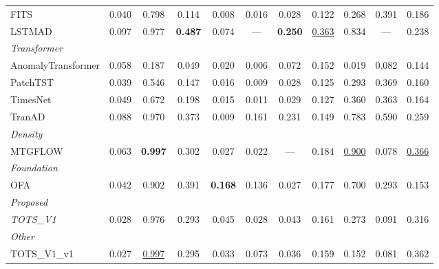 \begin{table}[t]
\begin{tabular}{lcccccccccc}
FITS & 0.040 & 0.798 & 0.114 & 0.008 & 0.016 & 0.028 & 0.122 & 0.268 & 0.391 & 0.186 \\
LSTMAD & 0.097 & 0.977 & \textbf{0.487} & 0.074 & --- & \textbf{0.250} & \underline{0.363} & 0.834 & --- & 0.238 \\
\midrule
\multicolumn{11}{l}{\textit{Transformer}} \\
AnomalyTransformer & 0.058 & 0.187 & 0.049 & 0.020 & 0.006 & 0.072 & 0.152 & 0.019 & 0.082 & 0.144 \\
PatchTST & 0.039 & 0.546 & 0.147 & 0.016 & 0.009 & 0.028 & 0.125 & 0.293 & 0.369 & 0.160 \\
TimesNet & 0.049 & 0.672 & 0.198 & 0.015 & 0.011 & 0.029 & 0.127 & 0.360 & 0.363 & 0.164 \\
TranAD & 0.088 & 0.970 & 0.373 & 0.009 & 0.161 & 0.231 & 0.149 & 0.783 & 0.590 & 0.259 \\
\midrule
\multicolumn{11}{l}{\textit{Density}} \\
MTGFLOW & 0.063 & \textbf{0.997} & 0.302 & 0.027 & 0.022 & --- & 0.184 & \underline{0.900} & 0.078 & \underline{0.366} \\
\midrule
\multicolumn{11}{l}{\textit{Foundation}} \\
OFA & 0.042 & 0.902 & 0.391 & \textbf{0.168} & 0.136 & 0.027 & 0.177 & 0.700 & 0.293 & 0.153 \\
\midrule
\multicolumn{11}{l}{\textit{Proposed}} \\
\textit{TOTS\_V1} & 0.028 & 0.976 & 0.293 & 0.045 & 0.028 & 0.043 & 0.161 & 0.273 & 0.091 & 0.316 \\
\midrule
\multicolumn{11}{l}{\textit{Other}} \\
TOTS\_V1\_v1 & 0.027 & \underline{0.997} & 0.295 & 0.033 & 0.073 & 0.036 & 0.159 & 0.152 & 0.081 & 0.362 \\
\bottomrule
\end{tabular}
\end{table}
